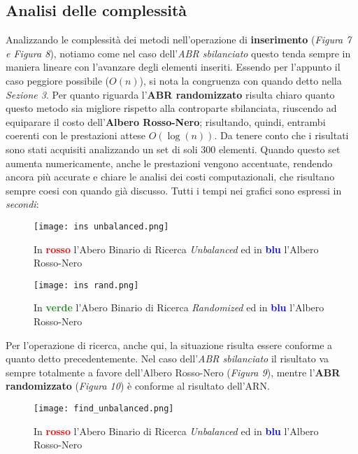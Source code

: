 \documentclass{article}
\begin{document}
\subsection{Analisi delle complessità}
Analizzando le complessità dei metodi nell'operazione di \textbf{inserimento} (\textit{Figura 7 e Figura 8}), notiamo come nel caso dell'\textit{ABR sbilanciato} questo tenda sempre in maniera lineare con l'avanzare degli elementi inseriti. Essendo per l'appunto il caso peggiore possibile ($O(n)$), si nota la congruenza con quando detto nella \textit{Sezione 3}. Per quanto riguarda l'\textbf{ABR randomizzato} risulta chiaro quanto questo metodo sia migliore rispetto alla controparte sbilanciata, riuscendo ad equiparare il costo dell'\textbf{Albero Rosso-Nero}; risultando, quindi, entrambi coerenti con le prestazioni attese $O(\log(n))$.
Da tenere conto che i risultati sono stati acquisiti analizzando un set di soli 300 elementi. Quando questo set aumenta numericamente, anche le prestazioni vengono accentuate, rendendo ancora più accurate e chiare le analisi dei costi computazionali, che risultano sempre coesi con quando già discusso. Tutti i tempi nei grafici sono espressi in \textit{secondi}:
\begin{figure}[!ht]
        \centering
        \texttt{[image: ins unbalanced.png]}
        \caption{In \textbf{\textcolor{red}{rosso}} l'Abero Binario di Ricerca \textit{Unbalanced} ed in \textbf{\textcolor{blue}{blu}} l'Albero Rosso-Nero}
        \label{fig:balvsarn}
\end{figure}

\begin{figure}[!ht]
        \centering
        \texttt{[image: ins rand.png]}
        \caption{In \textbf{\textcolor{ForestGreen}{verde}} l'Abero Binario di Ricerca \textit{Randomized} ed in \textbf{\textcolor{blue}{blu}} l'Albero Rosso-Nero}
        \label{fig:randvsarn}
\end{figure}

\clearpage

Per l'operazione di ricerca, anche qui, la situazione risulta essere conforme a quanto detto precedentemente. Nel caso dell'\textit{ABR sbilanciato} il risultato va sempre totalmente a favore dell'Albero Rosso-Nero (\textit{Figura 9}), mentre l'\textbf{ABR randomizzato} (\textit{Figura 10}) è conforme al risultato dell'ARN.
\begin{figure}[!ht]
        \centering
        \texttt{[image: find\_unbalanced.png]}
        \caption{In \textbf{\textcolor{red}{rosso}} l'Abero Binario di Ricerca \textit{Unbalanced} ed in \textbf{\textcolor{blue}{blu}} l'Albero Rosso-Nero}
        \label{fig:balanced_search}
\end{figure}
\end{document}
